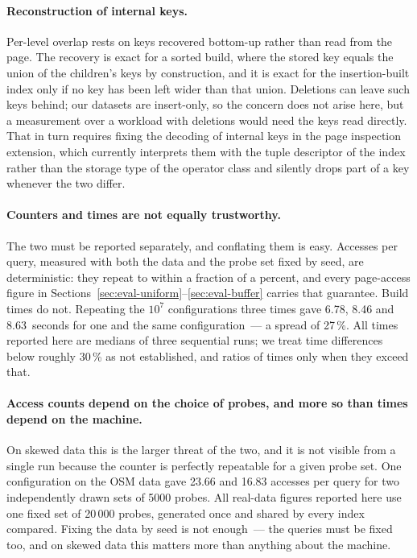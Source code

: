 \paragraph{Reconstruction of internal keys.} Per-level overlap rests on keys
recovered bottom-up rather than read from the page. The recovery is exact for a
sorted build, where the stored key equals the union of the children's keys by
construction, and it is exact for the insertion-built index only if no key has
been left wider than that union. Deletions can leave such keys behind; our
datasets are insert-only, so the concern does not arise here, but a measurement
over a workload with deletions would need the keys read directly. That in turn
requires fixing the decoding of internal keys in the page inspection extension,
which currently interprets them with the tuple descriptor of the index rather
than the storage type of the operator class and silently drops part of a key
whenever the two differ.

\paragraph{Counters and times are not equally trustworthy.} The two must be
reported separately, and conflating them is easy. Accesses
per query, measured with both the data and the probe set fixed by seed, are
deterministic: they repeat to within a fraction of a percent, and every
page-access figure in Sections~\ref{sec:eval-uniform}--\ref{sec:eval-buffer}
carries that guarantee. Build times do not. Repeating the $10^7$ configurations
three times gave 6.78, 8.46 and 8.63~seconds for one and the same
configuration~--- a spread of 27\,\%. All times reported here are medians of
three sequential runs; we treat time differences below roughly 30\,\% as not
established, and ratios of times only when they exceed that.

\paragraph{Access counts depend on the choice of probes, and more so than times
depend on the machine.} On skewed data this is the larger threat of the two, and
it is not visible from a single run because the counter is perfectly repeatable
for a given probe set. One configuration on the OSM data gave 23.66 and 16.83
accesses per query for two independently drawn sets of 5000 probes. All real-data
figures reported here use one fixed set of 20\,000 probes, generated once and
shared by every index compared. Fixing the data by seed is not enough~--- the
queries must be fixed too, and on skewed data this matters more than anything
about the machine.

